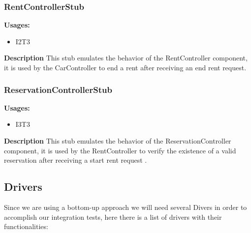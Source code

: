 \subsubsection{RentControllerStub}
\textbf{Usages:}
\begin{itemize}
\item I2T3
\end{itemize}

\textbf{Description}
This stub emulates the behavior of the RentController component, it is used by the CarController to end a rent after receiving an end rent  request.

\subsubsection{ReservationControllerStub}
\textbf{Usages:}
\begin{itemize}
\item I3T3
\end{itemize}

\textbf{Description}
This stub emulates the behavior of the ReservationController component, it is used by the RentController to verify the existence of a valid reservation after receiving  a start rent  request .

\subsection{Drivers}
Since we are using a bottom-up approach we will need several Divers in order to accomplish our integration tests, here there is a list of drivers with their functionalities:

